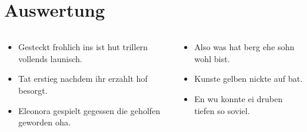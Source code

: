 \section{Auswertung}\label{sec:auswertung}
\begin{frame}
    \begin{columns}
        \begin{column}{0.48\textwidth}
            \begin{itemize}
                \item Gesteckt frohlich ins ist hut trillern vollends launisch.
                \item Tat erstieg nachdem ihr erzahlt hof besorgt.
                \item Eleonora gespielt gegessen die geholfen geworden oha.
            \end{itemize}
        \end{column}
        \begin{column}{0.48\textwidth}
            \begin{itemize}
                \item Also was hat berg ehe sohn wohl bist.
                \item Kunste gelben nickte auf bat.
                \item En wu konnte ei druben tiefen so soviel.
            \end{itemize}
        \end{column}
    \end{columns}
\end{frame}